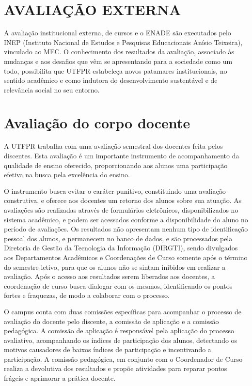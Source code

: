 \section{AVALIAÇÃO EXTERNA}

A avaliação institucional externa, de cursos e o ENADE são executados pelo INEP (Instituto Nacional de Estudos e Pesquisas Educacionais Anísio Teixeira), vinculado ao MEC. O conhecimento dos resultados da avaliação, associado às mudanças e aos desafios que vêm se apresentando para a sociedade como um todo, possibilita que UTFPR estabeleça novos patamares institucionais, no sentido acadêmico e como indutora do desenvolvimento sustentável e de relevância social no seu entorno.

\section{Avaliação do corpo docente}

A UTFPR trabalha com uma avaliação semestral dos docentes feita pelos discentes. Esta avaliação é um importante instrumento de acompanhamento da qualidade de ensino oferecido, proporcionando aos alunos uma participação efetiva na busca pela excelência do ensino.

O instrumento busca evitar o caráter punitivo, constituindo uma avaliação construtiva, e oferece aos docentes um retorno dos alunos sobre sua atuação. As avaliações são realizadas através de formulários eletrônicos, disponibilizados no sistema acadêmico, e podem ser acessados conforme a disponibilidade do aluno no período de avaliações. Os resultados não apresentam nenhum tipo de identificação pessoal dos alunos, e permanecem no banco de dados, e são processados pela Diretoria de Gestão da Tecnologia da Informação (DIRGTI), sendo divulgados aos Departamentos Acadêmicos e Coordenações de Curso somente após o término do semestre letivo, para que os alunos não se sintam inibidos em realizar a avaliação. Após o acesso aos resultados serem liberados aos docentes, a coordenação de curso busca dialogar com os mesmos, identificando os pontos fortes e fraquezas, de modo a colaborar com o processo.


O campus conta com duas comissões específicas para acompanhar o processo de avaliação do docente pelo discente, a comissão de aplicação e a comissão pedagógica. A comissão de aplicação é responsável pela aplicação do processo avaliativo, acompanhando os índices de participação dos alunos, detectando os motivos causadores de baixos índices de participação e incentivando a participação. A comissão pedagógica, em conjunto com o Coordenador de Curso realiza a devolutiva dos resultados e propõe atividades para reparar pontos frágeis e aprimorar a prática docente.

